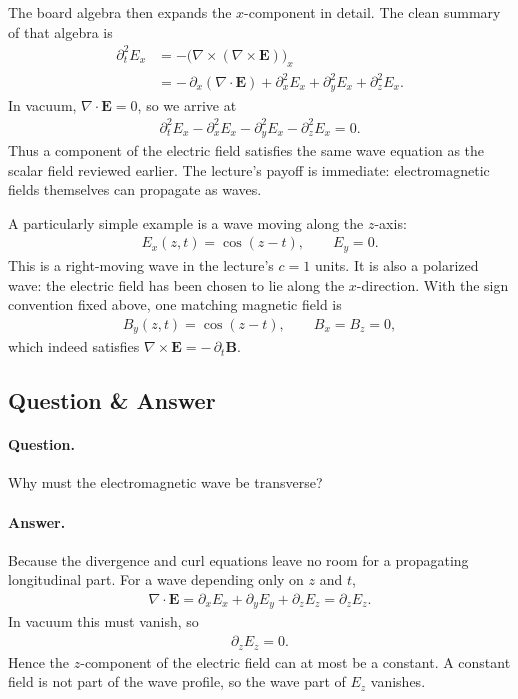 The board algebra then expands the \(x\)-component in detail. The clean summary of that algebra is
\begin{align}
\partial_t^2 E_x
&= -\bigl(\nabla \times (\nabla \times \mathbf E)\bigr)_x\\
&= -\,\partial_x(\nabla \cdot \mathbf E)
   + \partial_x^2 E_x + \partial_y^2 E_x + \partial_z^2 E_x.
\end{align}
In vacuum, \(\nabla \cdot \mathbf E = 0\), so we arrive at
\begin{align}
\partial_t^2 E_x - \partial_x^2 E_x - \partial_y^2 E_x - \partial_z^2 E_x = 0.
\end{align}
Thus a component of the electric field satisfies the same wave equation as the scalar field reviewed earlier. The lecture's payoff is immediate: electromagnetic fields themselves can propagate as waves.

A particularly simple example is a wave moving along the \(z\)-axis:
\begin{align}
E_x(z,t) = \cos(z-t), \qquad E_y = 0.
\end{align}
This is a right-moving wave in the lecture's \(c=1\) units. It is also a polarized wave: the electric field has been chosen to lie along the \(x\)-direction. With the sign convention fixed above, one matching magnetic field is
\begin{align}
B_y(z,t) = \cos(z-t), \qquad B_x = B_z = 0,
\end{align}
which indeed satisfies \(\nabla \times \mathbf E = -\,\partial_t \mathbf B\).

\subsection{Question \& Answer}

\paragraph{Question.} Why must the electromagnetic wave be transverse?

\paragraph{Answer.} Because the divergence and curl equations leave no room for a propagating longitudinal part. For a wave depending only on \(z\) and \(t\),
\begin{align}
\nabla \cdot \mathbf E
= \partial_x E_x + \partial_y E_y + \partial_z E_z
= \partial_z E_z.
\end{align}
In vacuum this must vanish, so
\begin{align}
\partial_z E_z = 0.
\end{align}
Hence the \(z\)-component of the electric field can at most be a constant. A constant field is not part of the wave profile, so the wave part of \(E_z\) vanishes.

